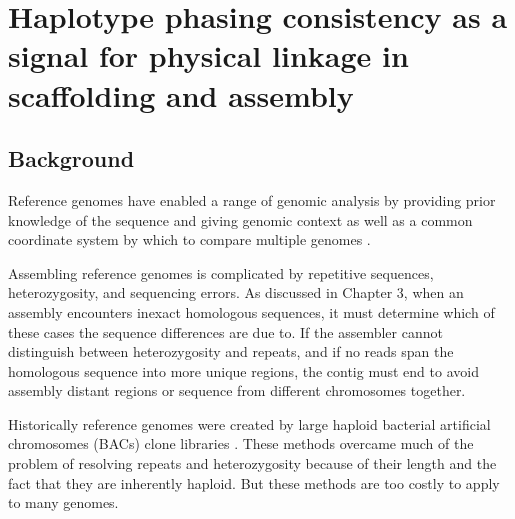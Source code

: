 %
\chapter{Haplotype phasing consistency as a signal for physical linkage in scaffolding and assembly}

\ifpdf
    \graphicspath{{Chapter3/Figs/Raster/}{Chapter3/Figs/PDF/}{Chapter3/Figs/}}
\else
    \graphicspath{{Chapter3/Figs/Vector/}{Chapter3/Figs/}}
\fi



\section{Background}
\par{
Reference genomes have enabled a range of genomic analysis by providing prior knowledge of the sequence 
and giving genomic context as well as a common coordinate system by which to compare multiple genomes \cite{1000genomes} \cite{GRCh38}.

Assembling reference genomes is complicated by repetitive sequences, heterozygosity, and sequencing errors. As discussed in 
Chapter 3, when an assembly encounters inexact homologous sequences, it must determine which of these cases the sequence differences are due to. 
If the assembler cannot distinguish between heterozygosity and repeats, and if no reads span the homologous sequence into more unique regions, the contig must end
to avoid assembly distant regions or sequence from different chromosomes together.


Historically reference genomes were created by large haploid bacterial artificial chromosomes (BACs) clone libraries \cite{human}. 
These methods overcame much of the problem of resolving repeats and heterozygosity because of their length and the fact that they are inherently haploid. But these methods are too costly to 
apply to many genomes.
}


